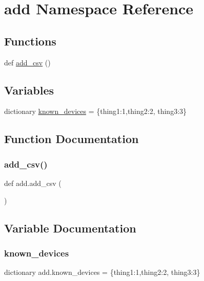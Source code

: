\hypertarget{namespaceadd}{}\section{add Namespace Reference}
\label{namespaceadd}
\subsection*{Functions}
\begin{DoxyCompactItemize}
\item 
def \hyperlink{namespaceadd_a1e2ffaf4beb8f6dee354e7869bdd2626}{add\+\_\+csv} ()
\end{DoxyCompactItemize}
\subsection*{Variables}
\begin{DoxyCompactItemize}
\item 
dictionary \hyperlink{namespaceadd_a2581e63d44964523db55474d0cb92b95}{known\+\_\+devices} = \{\textquotesingle{}thing1\textquotesingle{}\+:\textquotesingle{}1\textquotesingle{},\textquotesingle{}thing2\textquotesingle{}\+:\textquotesingle{}2\textquotesingle{}, \textquotesingle{}thing3\textquotesingle{}\+:\textquotesingle{}3\textquotesingle{}\}
\end{DoxyCompactItemize}


\subsection{Function Documentation}
\mbox{\label{namespaceadd_a1e2ffaf4beb8f6dee354e7869bdd2626}} 
\subsubsection{\texorpdfstring{add\+\_\+csv()}{add\_csv()}}
{\footnotesize\ttfamily def add.\+add\+\_\+csv (\begin{DoxyParamCaption}{ }\end{DoxyParamCaption})}



\subsection{Variable Documentation}
\mbox{\label{namespaceadd_a2581e63d44964523db55474d0cb92b95}} 
\subsubsection{\texorpdfstring{known\+\_\+devices}{known\_devices}}
{\footnotesize\ttfamily dictionary add.\+known\+\_\+devices = \{\textquotesingle{}thing1\textquotesingle{}\+:\textquotesingle{}1\textquotesingle{},\textquotesingle{}thing2\textquotesingle{}\+:\textquotesingle{}2\textquotesingle{}, \textquotesingle{}thing3\textquotesingle{}\+:\textquotesingle{}3\textquotesingle{}\}}

